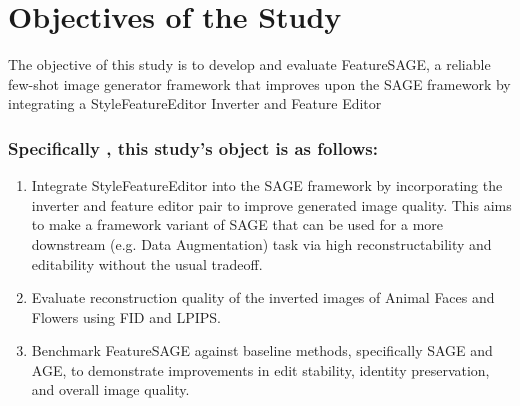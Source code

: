 \section{Objectives of the Study}

The objective of this study is to develop and evaluate FeatureSAGE, a reliable few-shot image generator framework that 
improves upon the SAGE framework by integrating a StyleFeatureEditor Inverter and Feature Editor

\subsubsection{Specifically , this study's object is as follows:}
\begin{enumerate}[label=\alph*.]
    \item Integrate StyleFeatureEditor into the SAGE framework by incorporating the inverter and feature editor pair to improve generated image quality.
    This aims to make a framework variant of SAGE that can be used for a more downstream (e.g. Data Augmentation) task via high reconstructability and editability without the usual tradeoff.

    \item Evaluate reconstruction quality of the inverted images of Animal Faces and Flowers using FID and LPIPS.
    
    \item Benchmark FeatureSAGE against baseline methods, specifically SAGE and AGE, to demonstrate improvements in edit stability, identity preservation, and overall image quality.

\end{enumerate}
